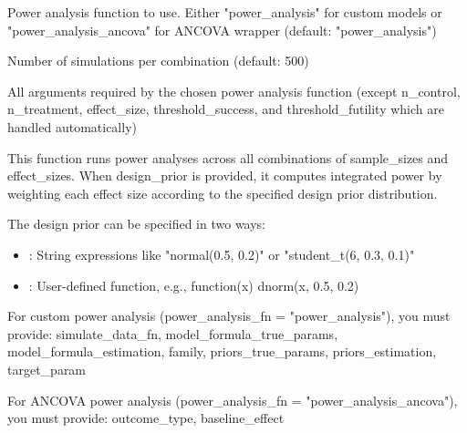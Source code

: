 \documentclass[letterpaper]{book}
\begin{document}
\begin{Arguments}
\begin{ldescription}
\item[\code{power\_analysis\_fn}] Power analysis function to use. Either "power\_analysis" for custom models or "power\_analysis\_ancova" for ANCOVA wrapper (default: "power\_analysis")

\item[\code{n\_simulations}] Number of simulations per combination (default: 500)

\item[\code{...}] All arguments required by the chosen power analysis function (except n\_control, n\_treatment, effect\_size, threshold\_success, and threshold\_futility which are handled automatically)
\end{ldescription}
\end{Arguments}
%
\begin{Details}
This function runs power analyses across all combinations of sample\_sizes and effect\_sizes.
When design\_prior is provided, it computes integrated power by weighting each effect size
according to the specified design prior distribution.

The design prior can be specified in two ways:
\begin{itemize}

\item{} : String expressions like "normal(0.5, 0.2)" or "student\_t(6, 0.3, 0.1)"
\item{} : User-defined function, e.g., function(x) dnorm(x, 0.5, 0.2)

\end{itemize}


For custom power analysis (power\_analysis\_fn = "power\_analysis"), you must provide:
simulate\_data\_fn, model\_formula\_true\_params, model\_formula\_estimation, family,
priors\_true\_params, priors\_estimation, target\_param

For ANCOVA power analysis (power\_analysis\_fn = "power\_analysis\_ancova"), you must provide:
outcome\_type, baseline\_effect
\end{Details}
%
\end{document}
